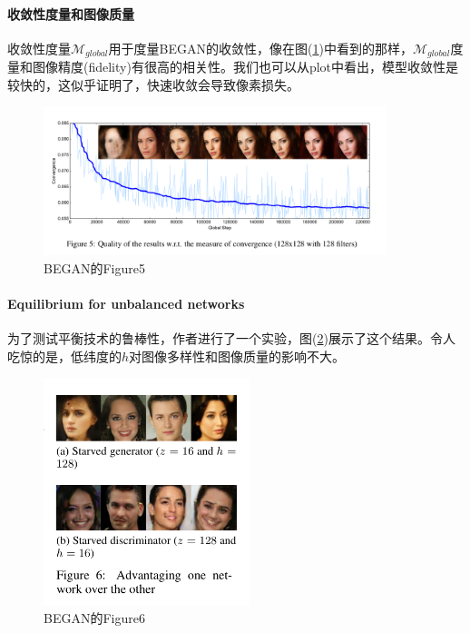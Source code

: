             \paragraph{收敛性度量和图像质量}收敛性度量$\mathcal{M}_{global}$用于度量BEGAN的收敛性，像在图(\ref{fig:BEGAN的Figure5})中看到的那样，$\mathcal{M}_{global}$度量和图像精度(fidelity)有很高的相关性。我们也可以从plot中看出，模型收敛性是较快的，这似乎证明了，快速收敛会导致像素损失。
                \begin{figure}[H]
                \centering
                \includegraphics[width=10cm]{images/BEGAN_Figure5.jpg}
                \caption{BEGAN的Figure5}
                \label{fig:BEGAN的Figure5}
                \end{figure}
            \paragraph{Equilibrium for unbalanced networks}为了测试平衡技术的鲁棒性，作者进行了一个实验，图(\ref{fig:BEGAN的Figure6})展示了这个结果。令人吃惊的是，低纬度的$h$对图像多样性和图像质量的影响不大。
                \begin{figure}[H]
                \centering
                \includegraphics[width=6cm]{images/BEGAN_Figure6.jpg}
                \caption{BEGAN的Figure6}
                \label{fig:BEGAN的Figure6}
                \end{figure}




% 
